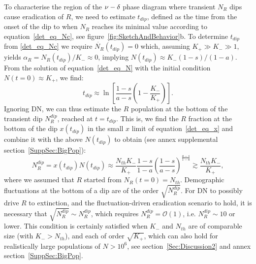\documentclass{article}
\begin{document}
To characterise the region of the $\nu \--\delta$ phase diagram where transient $N_R$ dips cause eradication of $R$, we need to estimate $t_{dip}$, defined as the time from the onset of the dip to when $N_R$ reaches its minimal value according to equation~\eqref{det_eq_Nc}, see figure~\ref{fig:SketchAndBehavior}b. To determine $t_{dip}$ from \eqref{det_eq_Nc} we require $\dot{N_R}(t_{dip})=0$ which, assuming  $K_+\gg K_-\gg 1$, yields \(\alpha_R=N_R(t_{dip})/K_{-}\approx0\), implying \(N(t_{dip})\approx K_-(1-s)/(1-a)\). From the solution of equation~\eqref{det_eq_N} with the initial condition \(N(t=0)\approx K_+\), we find:
\begin{equation}
    t_{dip}\approx\ln{\left[\frac{1-s}{a-s}\left(1-\frac{K_-}{K_+}\right)\right]}.
    \label{eq:tdip}
\end{equation}
Ignoring DN, we can thus estimate the \(R\) population at the bottom of the transient dip \(N_{R}^{dip}\), reached at $t=t_{dip}$. This is, we find the \(R\) fraction at the bottom of the dip \(x\left(t_{dip}\right)\) in the small \(x\) limit of equation~\eqref{det_eq_x} and combine it with the above \(N(t_{dip})\) to obtain (see annex supplemental section~\ref{SuppSec:BigPop}):
\begin{equation}
    N_{R}^{dip}=x(t_{dip})N(t_{dip})\approx\frac{N_{th}K_{-}}{K_{+}}\frac{1-s}{1-a}\left(\frac{1-s}{a-s}\right)^{\frac{a-s}{1-a}}\gtrsim\frac{N_{th}K_{-}}{K_{+}},
\label{Eq:betterNdip}
\end{equation}
where we assumed that $R$ started from \(N_R(t=0)=N_{th}\). Demographic fluctuations at the bottom of a dip are of the order $\sqrt{N_{R}^{dip}}$. For DN to possibly drive $R$ to extinction, and the fluctuation-driven eradication scenario to hold, it is necessary that $\sqrt{N_{R}^{dip}}\sim N_{R}^{dip}$, which requires $N_{R}^{dip}=\mathcal{O}(1)$, i.e. $N_{R}^{dip}\sim 10$ or lower. This condition is certainly satisfied when $K_-$ and $N_{th}$  are of comparable size (with $K_->N_{th}$), and each of order \(\sqrt{K_{+}}\), which can also hold for realistically large populations of \(N>10^6\), see section~\ref{Sec:Discussion2} and annex section~\ref{SuppSec:BigPop}.
\end{document}
